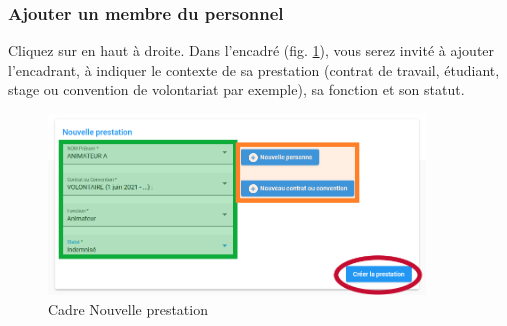 \subsubsection{Ajouter un membre du personnel}
Cliquez sur  en haut à droite. Dans l'encadré  (fig. \ref{fig:cdv_new_prestation}), vous serez invité à ajouter l'encadrant, à indiquer le contexte de sa prestation (contrat de travail, étudiant, stage ou convention de volontariat par exemple), sa fonction et son statut. 

\begin{figure}
    \centering
    \includegraphics[width=10cm]{Images/cdv/new_prestation.png}
    \caption{Cadre Nouvelle prestation}
    \label{fig:cdv_new_prestation}
\end{figure}


